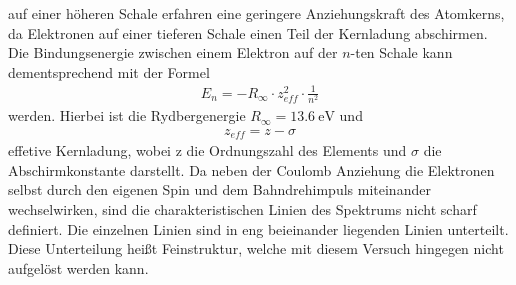 \justifying auf einer höheren Schale erfahren eine geringere Anziehungskraft des Atomkerns, da Elektronen auf einer tieferen
Schale einen Teil der Kernladung abschirmen. Die Bindungsenergie zwischen einem Elektron auf der $n$-ten Schale kann dementsprechend mit der 
Formel \cite{V602}
\begin{align}
    E_n = -R_{\infty}\cdot z_{eff}^2 \cdot \frac{1}{n^2} \label{eq:1}
\end{align}
\justifying werden. Hierbei ist die Rydbergenergie $R_{\infty}=\SI{13.6}{\electronvolt}$ und 
\begin{align}
    z_{eff}=z-\sigma \label{eq:2}
\end{align}
\justifying effetive Kernladung, wobei z die Ordnungszahl des Elements und $\sigma$ die Abschirmkonstante darstellt. 
Da neben der Coulomb Anziehung die Elektronen selbst durch den eigenen Spin und dem Bahndrehimpuls miteinander wechselwirken, sind die
charakteristischen Linien des Spektrums nicht scharf definiert. Die einzelnen Linien sind in eng beieinander liegenden Linien unterteilt. Diese 
Unterteilung heißt Feinstruktur, welche mit diesem Versuch hingegen nicht aufgelöst werden kann. 

